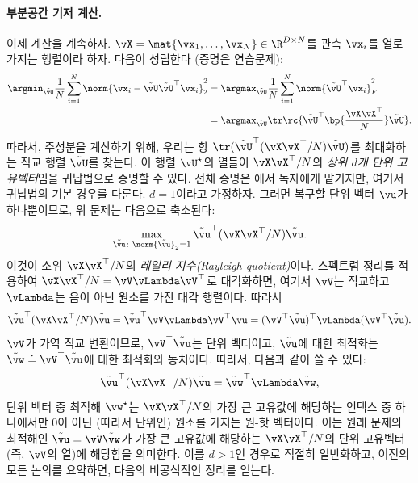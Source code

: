 \documentclass[../../book-main_ko.tex]{subfiles}
\begin{document}
\paragraph{부분공간 기저 계산.}
이제 계산을 계속하자. \(\vX = \mat{\vx_{1}, \dots, \vx_{N}} \in \R^{D \times N}\)를 관측 \(\vx_{i}\)를 열로 가지는 행렬이라 하자. 다음이 성립한다 (증명은 연습문제):
\begin{align}
    \argmin_{\tilde{\vU}}\frac{1}{N}\sum_{i = 1}^{N}\norm{\vx_{i} - \tilde{\vU}\tilde{\vU}^{\top}\vx_{i}}_{2}^{2}
    &= \argmax_{\tilde{\vU}}\frac{1}{N}\sum_{i = 1}^{N}\norm{\tilde{\vU}^{\top}\vx_{i}}_{F}^{2} \\
    &= \argmax_{\tilde{\vU}}\tr\rc{\tilde{\vU}^{\top}\bp{\frac{\vX\vX^{\top}}{N}}\tilde{\vU}}.
\end{align}
따라서, 주성분을 계산하기 위해, 우리는 항 \(\tr(\tilde{\vU}^{\top}(\vX\vX^{\top}/N)\tilde{\vU})\)를 최대화하는 직교 행렬 \(\tilde{\vU}\)를 찾는다. 이 행렬 \(\vU^{\star}\)의 열들이 \(\vX\vX^{\top}/N\)의 \textit{상위 \(d\)개 단위 고유벡터}임을 귀납법으로 증명할 수 있다. 전체 증명은 에서 독자에게 맡기지만, 여기서 귀납법의 기본 경우를 다룬다. \(d = 1\)이라고 가정하자. 그러면 복구할 단위 벡터 \(\vu\)가 하나뿐이므로, 위 문제는 다음으로 축소된다:
\begin{equation}
    \max_{\tilde{\vu} \colon \norm{\tilde{\vu}}_{2} = 1} \tilde{\vu}^{\top}(\vX\vX^{\top}/N)\tilde{\vu}.
\end{equation}
이것이 소위 \(\vX\vX^{\top}/N\)의 \textit{레일리 지수(Rayleigh quotient)}이다. 스펙트럼 정리를 적용하여 \(\vX\vX^{\top}/N = \vV\vLambda\vV^{\top}\)로 대각화하면, 여기서 \(\vV\)는 직교하고 \(\vLambda\)는 음이 아닌 원소를 가진 대각 행렬이다. 따라서
\begin{equation}
    \tilde{\vu}^{\top}(\vX\vX^{\top}/N)\tilde{\vu} = \tilde{\vu}^{\top}\vV\vLambda\vV^{\top}\vu = (\vV^{\top}\tilde{\vu})^{\top}\vLambda(\vV^{\top}\tilde{\vu}).
\end{equation}
\(\vV\)가 가역 직교 변환이므로, \(\vV^{\top}\tilde{\vu}\)는 단위 벡터이고, \(\tilde{\vu}\)에 대한 최적화는 \(\tilde{\vw} \doteq \vV^{\top}\tilde{\vu}\)에 대한 최적화와 동치이다. 따라서, 다음과 같이 쓸 수 있다:
\begin{equation}
    \tilde{\vu}^{\top}(\vX\vX^{\top}/N)\tilde{\vu} = \tilde{\vw}^{\top}\vLambda\tilde{\vw},
\end{equation}
단위 벡터 중 최적해 \(\vw^{\star}\)는 \(\vX\vX^{\top}/N\)의 가장 큰 고유값에 해당하는 인덱스 중 하나에서만 0이 아닌 (따라서 단위인) 원소를 가지는 원-핫 벡터이다. 이는 원래 문제의 최적해인 \(\tilde{\vu} = \vV\tilde{\vw}\)가 가장 큰 고유값에 해당하는 \(\vX\vX^{\top}/N\)의 단위 고유벡터 (즉, \(\vV\)의 열)에 해당함을 의미한다. 이를 \(d > 1\)인 경우로 적절히 일반화하고, 이전의 모든 논의를 요약하면, 다음의 비공식적인 정리를 얻는다.
\end{document}
